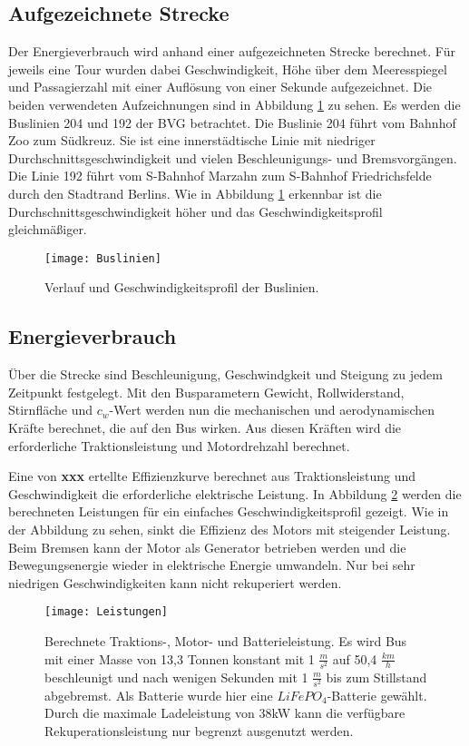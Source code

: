 \subsection{Aufgezeichnete Strecke}
Der Energieverbrauch wird anhand einer aufgezeichneten Strecke berechnet. Für jeweils eine Tour wurden dabei Geschwindigkeit, Höhe über dem Meeresspiegel und Passagierzahl mit einer Auflösung von einer Sekunde aufgezeichnet. Die beiden verwendeten Aufzeichnungen sind in Abbildung \ref{Buslinien} zu sehen. Es werden die Buslinien 204 und 192 der BVG betrachtet. Die Buslinie 204 führt vom Bahnhof Zoo zum Südkreuz. Sie ist eine innerstädtische Linie mit niedriger Durchschnittsgeschwindigkeit und vielen Beschleunigungs- und Bremsvorgängen. Die Linie 192 führt vom S-Bahnhof Marzahn zum S-Bahnhof Friedrichsfelde durch den Stadtrand Berlins. Wie in Abbildung \ref{Buslinien} erkennbar ist die Durchschnittsgeschwindigkeit höher und das Geschwindigkeitsprofil gleichmäßiger.
\begin{figure}\centering
	\texttt{[image: Buslinien]}
	\caption[Verlauf und Geschwindigkeitsprofil der Buslinien]{Verlauf und Geschwindigkeitsprofil der Buslinien.}
	\label{Buslinien}
\end{figure}

\subsection{Energieverbrauch}
Über die Strecke sind Beschleunigung, Geschwindgkeit und Steigung zu jedem Zeitpunkt festgelegt. Mit den Busparametern Gewicht, Rollwiderstand, Stirnfläche und $c_w$-Wert werden nun die mechanischen und aerodynamischen Kräfte berechnet, die auf den Bus wirken. Aus diesen Kräften wird die erforderliche Traktionsleistung und Motordrehzahl berechnet.

Eine von \textbf{xxx} ertellte Effizienzkurve berechnet aus Traktionsleistung und Geschwindigkeit die erforderliche elektrische Leistung. In Abbildung \ref{abb_Leistungen} werden die berechneten Leistungen für ein einfaches Geschwindigkeitsprofil gezeigt. Wie in der Abbildung zu sehen, sinkt die Effizienz des Motors mit steigender Leistung. Beim Bremsen kann der Motor als Generator betrieben werden und die Bewegungsenergie wieder in elektrische Energie umwandeln. Nur bei sehr niedrigen Geschwindigkeiten kann nicht rekuperiert werden.
\begin{figure}\centering
	\texttt{[image: Leistungen]}
	\caption[Berechnete Traktions-, Motor- und Batterieleistung]{Berechnete Traktions-, Motor- und Batterieleistung. Es wird Bus mit einer Masse von 13,3 Tonnen konstant mit 1 $\frac{m}{s^2}$ auf 50,4 $\frac{km}{h}$ beschleunigt und nach wenigen Sekunden mit 1 $\frac{m}{s^2}$ bis zum Stillstand abgebremst. Als Batterie wurde hier eine $LiFePO_4$-Batterie gewählt. Durch die maximale Ladeleistung von 38kW kann die verfügbare Rekuperationsleistung nur begrenzt ausgenutzt werden.}
	\label{abb_Leistungen}
\end{figure}


